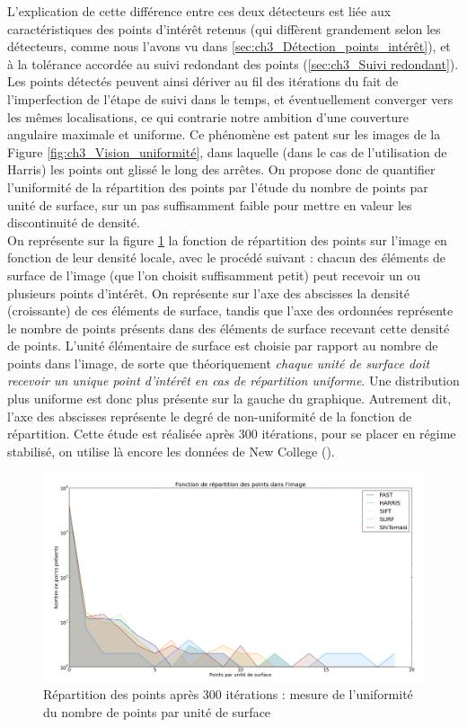 L'explication de cette différence entre ces deux détecteurs est liée aux caractéristiques des points d'intérêt retenus (qui diffèrent grandement selon les détecteurs, comme nous l'avons vu dans \ref{sec:ch3_Détection_points_intérêt}), et à la tolérance accordée au suivi redondant des points (\ref{sec:ch3_Suivi redondant}). Les points détectés peuvent ainsi dériver au fil des itérations du fait de l'imperfection de l'étape de suivi dans le temps, et éventuellement converger vers les mêmes localisations, ce qui contrarie notre ambition d'une couverture angulaire maximale et uniforme. Ce phénomène est patent sur les images de la Figure \ref{fig:ch3_Vision_uniformité}, dans laquelle (dans le cas de l'utilisation de Harris) les points ont \og glissé\fg{} le long des arrêtes. On propose donc de quantifier l'uniformité de la répartition des points par l'étude du nombre de points par unité de surface, sur un pas suffisamment faible pour mettre en valeur les discontinuité de densité. \\
On représente sur la figure \ref{fig:ch3_Vision_densité} la fonction de répartition des points sur l'image en fonction de leur densité locale, avec le procédé suivant : chacun des éléments de surface de l'image (que l'on choisit suffisamment petit) peut recevoir un ou plusieurs points d'intérêt. On représente sur l'axe des abscisses la densité (croissante) de ces éléments de surface, tandis que l'axe des ordonnées représente le nombre de points présents dans des éléments de surface recevant cette densité de points. L'unité élémentaire de surface est choisie par rapport au nombre de points dans l'image, de sorte que théoriquement \textit{chaque unité de surface doit recevoir un unique point d'intérêt en cas de répartition uniforme}. Une distribution plus uniforme est donc plus présente sur la gauche du graphique. Autrement dit, l'axe des abscisses représente le degré de non-uniformité de la fonction de répartition. Cette étude est réalisée après 300 itérations, pour se placer en régime stabilisé, on utilise là encore les données de New College (\cite{Smith2009}).

\begin{figure}[H]
	\centering
	\includegraphics[width=\textwidth]{Chapter3/graphics/Detectors_comparison_density.png}
	\caption{Répartition des points après 300 itérations : mesure de l'uniformité du nombre de points par unité de surface}
	\label{fig:ch3_Vision_densité}
\end{figure}


